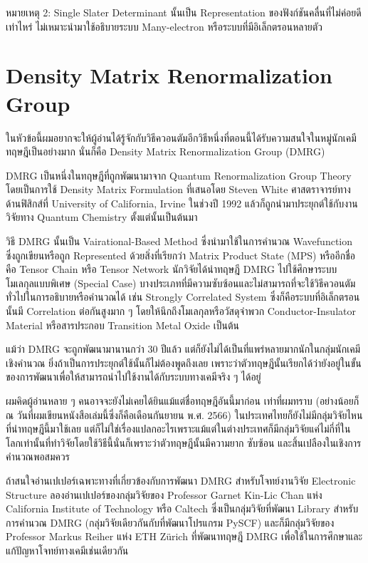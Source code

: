 \noindent หมายเหตุ 2: Single Slater Determinant นั้นเป็น Representation ของฟังก์ชันคลื่นที่ไม่ค่อยดีเท่าไหร่ ไม่เหมาะนำมาใช้อธิบายระบบ Many-electron หรือระบบที่มีอิเล็กตรอนหลายตัว

\section{Density Matrix Renormalization Group}

ในหัวข้อนี้ผมอยากจะให้ผู้อ่านได้รู้จักกับวิธีควอนตัมอีกวิธีหนึ่งที่ตอนนี้ได้รับความสนใจในหมู่นักเคมีทฤษฎีเป็นอย่างมาก นั่นก็คือ Density Matrix Renormalization Group (DMRG)

DMRG เป็นหนึ่งในทฤษฎีที่ถูกพัฒนามาจาก Quantum Renormalization Group Theory โดยเป็นการใช้ Density Matrix Formulation ที่เสนอโดย Steven White ศาสตราจารย์ทางด้านฟิสิกส์ที่ University of California, Irvine ในช่วงปี 1992 แล้วก็ถูกนำมาประยุกต์ใช้กับงานวิจัยทาง Quantum Chemistry ตั้งแต่นั้นเป็นต้นมา

วิธี DMRG นั้นเป็น Vairational-Based Method ซึ่งนำมาใช้ในการคำนวณ Wavefunction ซึ่งถูกเขียนหรือถูก Represented ด้วยสิ่งที่เรียกว่า Matrix Product State (MPS) หรืออีกชื่อคือ Tensor Chain หรือ Tensor Network นักวิจัยได้นำทฤษฎี DMRG ไปใช้ศึกษาระบบโมเลกุลแบบพิเศษ (Special Case) บางประเภทที่มีความซับซ้อนและไม่สามารถที่จะใช้วิธีควอนตัมทั่วไปในการอธิบายหรือคำนวณได้ เช่น Strongly Correlated System ซึ่งก็คือระบบที่อิเล็กตรอนนั้นมี Correlation ต่อกันสูงมาก ๆ โดยให้นึกถึงโมเลกุลหรือวัสดุจำพวก Conductor-Insulator Material หรือสารประกอบ Transition Metal Oxide เป็นต้น

แม้ว่า DMRG จะถูกพัฒนามานานกว่า 30 ปีแล้ว แต่ก็ยังไม่ได้เป็นที่แพร่หลายมากนักในกลุ่มนักเคมีเชิงคำนวณ ยิ่งถ้าเป็นการประยุกต์ใช้นั้นก็ไม่ต้องพูดถึงเลย เพราะว่าตัวทฤษฎีนั้นเรียกได้ว่ายังอยู่ในขั้นของการพัฒนาเพื่อให้สามารถนำไปใช้งานได้กับระบบทางเคมีจริง ๆ ได้อยู่

ผมคิดผู้อ่านหลาย ๆ คนอาจจะยังไม่เคยได้ยินแม้แต่ชื่อทฤษฎีอันนี้มาก่อน เท่าที่ผมทราบ (อย่างน้อยก็ ณ วันที่ผมเขียนหนังสือเล่มนี้ซึ่งก็คือเดือนกันยายน พ.ศ. 2566) ในประเทศไทยก็ยังไม่มีกลุ่มวิจัยไหนที่นำทฤษฎีนี้มาใช้เลย แต่ก็ไม่ใช่เรื่องแปลกอะไรเพราะแม้แต่ในต่างประเทศก็มีกลุ่มวิจัยแค่ไม่กี่ที่ในโลกเท่านั้นที่ทำวิจัยโดยใช้วิธีนี้นั่นก็เพราะว่าตัวทฤษฎีนั้นมีความยาก ซับซ้อน และสิ้นเปลืองในเชิงการคำนวณพอสมควร

ถ้าสนใจอ่านเปเปอร์เฉพาะทางที่เกี่ยวข้องกับการพัฒนา DMRG สำหรับโจทย์งานวิจัย Electronic Structure ลองอ่านเปเปอร์ของกลุ่มวิจัยของ Professor Garnet Kin-Lic Chan แห่ง California Institute of Technology หรือ Caltech ซึ่งเป็นกลุ่มวิจัยที่พัฒนา Library สำหรับการคำนวณ DMRG (กลุ่มวิจัยเดียวกันกับที่พัฒนาโปรแกรม PySCF) และก็มีกลุ่มวิจัยของ Professor Markus Reiher แห่ง ETH Zürich ที่พัฒนาทฤษฎี DMRG เพื่อใช้ในการศึกษาและแก้ปัญหาโจทย์ทางเคมีเช่นเดียวกัน

